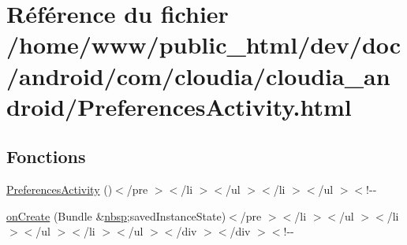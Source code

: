 \hypertarget{_preferences_activity_8html}{\section{Référence du fichier /home/www/public\-\_\-html/dev/doc/android/com/cloudia/cloudia\-\_\-android/\-Preferences\-Activity.html}
\label{_preferences_activity_8html}
}
\subsection*{Fonctions}
\begin{DoxyCompactItemize}
\item 
\hyperlink{_preferences_activity_8html_a7fcae3c7e0939bc8722c8177c5706ab5}{Preferences\-Activity} ()$<$/pre $>$$<$/li $>$$<$/ul $>$$<$/li $>$$<$/ul $>$$<$!-\/-\/
\item 
\hyperlink{_preferences_activity_8html_a0233025f570041b1da5bd93bc039a07a}{on\-Create} (Bundle \&\hyperlink{_tools_8html_aef915316f784c9063d942974538301a6}{nbsp};saved\-Instance\-State)$<$/pre $>$$<$/li $>$$<$/ul $>$$<$/li $>$$<$/ul $>$$<$/li $>$$<$/ul $>$$<$/div $>$$<$/div $>$$<$!-\/-\/
\end{DoxyCompactItemize}
